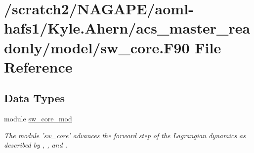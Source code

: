 \section{/scratch2/\-N\-A\-G\-A\-P\-E/aoml-\/hafs1/\-Kyle.Ahern/acs\-\_\-master\-\_\-readonly/model/sw\-\_\-core.F90 File Reference}
\label{sw__core_8F90}
\subsection*{Data Types}
\begin{DoxyCompactItemize}
\item 
module \hyperlink{classsw__core__mod}{sw\-\_\-core\-\_\-mod}
\begin{DoxyCompactList}\small\item\em The module 'sw\-\_\-core' advances the forward step of the Lagrangian dynamics as described by \cite{lin1997explicit}, \cite{lin2004vertically}, and \cite{harris2013two}. \end{DoxyCompactList}\end{DoxyCompactItemize}
